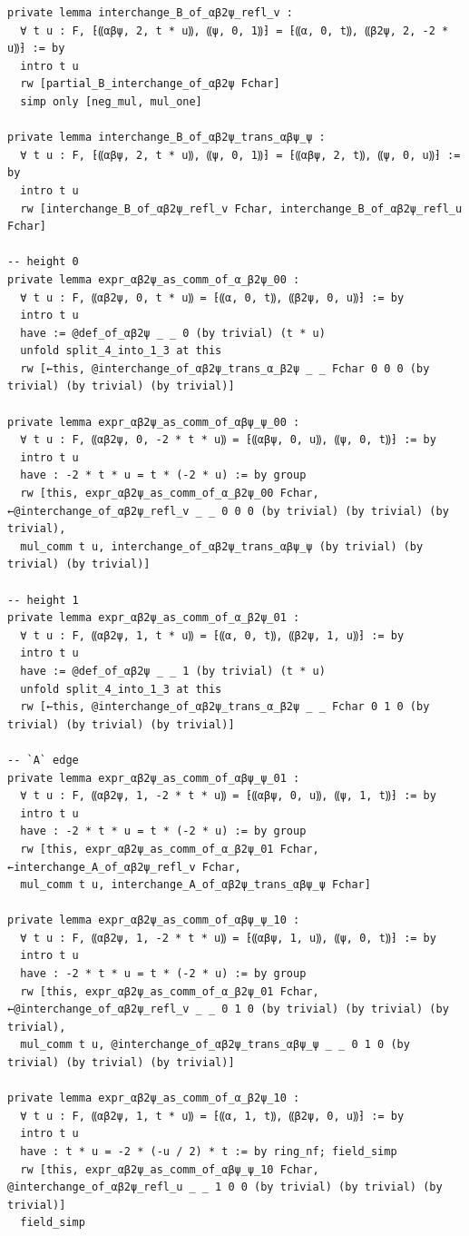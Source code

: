 \documentclass[10pt,a4paper]{article}
\begin{document}
\begin{Verbatim}
private lemma interchange_B_of_αβ2ψ_refl_v :
  ∀ t u : F, ⁅⸨αβψ, 2, t * u⸩, ⸨ψ, 0, 1⸩⁆ = ⁅⸨α, 0, t⸩, ⸨β2ψ, 2, -2 * u⸩⁆ := by
  intro t u
  rw [partial_B_interchange_of_αβ2ψ Fchar]
  simp only [neg_mul, mul_one]

private lemma interchange_B_of_αβ2ψ_trans_αβψ_ψ :
  ∀ t u : F, ⁅⸨αβψ, 2, t * u⸩, ⸨ψ, 0, 1⸩⁆ = ⁅⸨αβψ, 2, t⸩, ⸨ψ, 0, u⸩⁆ := by
  intro t u
  rw [interchange_B_of_αβ2ψ_refl_v Fchar, interchange_B_of_αβ2ψ_refl_u Fchar]

-- height 0
private lemma expr_αβ2ψ_as_comm_of_α_β2ψ_00 :
  ∀ t u : F, ⸨αβ2ψ, 0, t * u⸩ = ⁅⸨α, 0, t⸩, ⸨β2ψ, 0, u⸩⁆ := by
  intro t u
  have := @def_of_αβ2ψ _ _ 0 (by trivial) (t * u)
  unfold split_4_into_1_3 at this
  rw [←this, @interchange_of_αβ2ψ_trans_α_β2ψ _ _ Fchar 0 0 0 (by trivial) (by trivial) (by trivial)]

private lemma expr_αβ2ψ_as_comm_of_αβψ_ψ_00 :
  ∀ t u : F, ⸨αβ2ψ, 0, -2 * t * u⸩ = ⁅⸨αβψ, 0, u⸩, ⸨ψ, 0, t⸩⁆ := by
  intro t u
  have : -2 * t * u = t * (-2 * u) := by group
  rw [this, expr_αβ2ψ_as_comm_of_α_β2ψ_00 Fchar, ←@interchange_of_αβ2ψ_refl_v _ _ 0 0 0 (by trivial) (by trivial) (by trivial),
  mul_comm t u, interchange_of_αβ2ψ_trans_αβψ_ψ (by trivial) (by trivial) (by trivial)]

-- height 1
private lemma expr_αβ2ψ_as_comm_of_α_β2ψ_01 :
  ∀ t u : F, ⸨αβ2ψ, 1, t * u⸩ = ⁅⸨α, 0, t⸩, ⸨β2ψ, 1, u⸩⁆ := by
  intro t u
  have := @def_of_αβ2ψ _ _ 1 (by trivial) (t * u)
  unfold split_4_into_1_3 at this
  rw [←this, @interchange_of_αβ2ψ_trans_α_β2ψ _ _ Fchar 0 1 0 (by trivial) (by trivial) (by trivial)]

-- `A` edge
private lemma expr_αβ2ψ_as_comm_of_αβψ_ψ_01 :
  ∀ t u : F, ⸨αβ2ψ, 1, -2 * t * u⸩ = ⁅⸨αβψ, 0, u⸩, ⸨ψ, 1, t⸩⁆ := by
  intro t u
  have : -2 * t * u = t * (-2 * u) := by group
  rw [this, expr_αβ2ψ_as_comm_of_α_β2ψ_01 Fchar, ←interchange_A_of_αβ2ψ_refl_v Fchar,
  mul_comm t u, interchange_A_of_αβ2ψ_trans_αβψ_ψ Fchar]

private lemma expr_αβ2ψ_as_comm_of_αβψ_ψ_10 :
  ∀ t u : F, ⸨αβ2ψ, 1, -2 * t * u⸩ = ⁅⸨αβψ, 1, u⸩, ⸨ψ, 0, t⸩⁆ := by
  intro t u
  have : -2 * t * u = t * (-2 * u) := by group
  rw [this, expr_αβ2ψ_as_comm_of_α_β2ψ_01 Fchar, ←@interchange_of_αβ2ψ_refl_v _ _ 0 1 0 (by trivial) (by trivial) (by trivial),
  mul_comm t u, @interchange_of_αβ2ψ_trans_αβψ_ψ _ _ 0 1 0 (by trivial) (by trivial) (by trivial)]

private lemma expr_αβ2ψ_as_comm_of_α_β2ψ_10 :
  ∀ t u : F, ⸨αβ2ψ, 1, t * u⸩ = ⁅⸨α, 1, t⸩, ⸨β2ψ, 0, u⸩⁆ := by
  intro t u
  have : t * u = -2 * (-u / 2) * t := by ring_nf; field_simp
  rw [this, expr_αβ2ψ_as_comm_of_αβψ_ψ_10 Fchar, @interchange_of_αβ2ψ_refl_u _ _ 1 0 0 (by trivial) (by trivial) (by trivial)]
  field_simp


\end{Verbatim}
\end{document}
